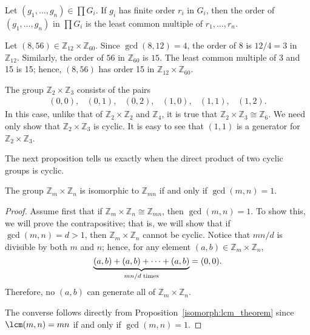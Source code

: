 \begin{corollary}
Let $(g_1, \ldots, g_n) \in \prod G_i$. If $g_i$ has finite order
$r_i$ in $G_i$, then the order of $(g_1, \ldots, g_n)$ in $\prod G_i$
is the least common multiple of $r_1, \ldots, r_n$.
\end{corollary}
 
 
\begin{example}\label{example:isomorph:Z12xZ60}
Let $(8, 56) \in {\mathbb Z}_{12} \times  {\mathbb Z}_{60}$. Since
$\gcd(8,12) = 4$, the order of 8 is $12/4 = 3$ in ${\mathbb Z}_{12}$.
Similarly, the order of $56$ in ${\mathbb Z}_{60}$ is $15$. The least
common multiple of 3 and 15 is 15; hence, $(8, 56)$ has order 15 in
${\mathbb Z}_{12} \times  {\mathbb Z}_{60}$.
\end{example}

 
\begin{example}\label{example:isomorph:Z2xZ3}
The group ${\mathbb Z}_2 \times {\mathbb Z}_3$ consists of the pairs
\[
\begin{array}{cccccc}
(0,0),& (0, 1),& (0, 2),& (1,0),& (1, 1),& (1, 2).
\end{array}
\]
In this case, unlike that of ${\mathbb Z}_2 \times {\mathbb Z}_2$ and
${\mathbb Z}_4$, it 
is true that ${\mathbb Z}_2  \times {\mathbb Z}_3 \cong {\mathbb Z}_6$. We need
only show that ${\mathbb Z}_2  \times {\mathbb Z}_3$ is cyclic.  It is
easy to see that $(1,1)$ is a generator for ${\mathbb Z}_2  \times {\mathbb
Z}_3$. 
\end{example}

 
The next proposition tells us exactly when the direct product of two
cyclic groups is cyclic. 
 

\begin{thm}\label{Z_pq_theorem}
The group ${\mathbb Z}_m \times {\mathbb Z}_n$ is isomorphic to ${\mathbb
Z}_{mn}$ if and only if $\gcd(m,n)=1$. 
\end{thm}
 

\begin{proof}
Assume first that if ${\mathbb Z}_m \times {\mathbb Z}_n \cong {\mathbb
Z}_{mn}$, then $\gcd(m, n) = 1$. To show this, we will prove the
contrapositive; that is, we will show that if $\gcd(m, n) = d >
1$, then ${\mathbb Z}_m \times {\mathbb Z}_n$ cannot be cyclic. Notice that
$mn/d$ is divisible by both $m$ and $n$; hence, for any element $(a,b)
\in {\mathbb Z}_m \times {\mathbb Z}_n$,  
\[
\underbrace{(a,b) + (a,b)+ \cdots + (a,b)}_{mn/d \; {\rm
times}}
= (0, 0).
\]
Therefore, no $(a, b)$ can generate all of ${\mathbb Z}_m \times {\mathbb
Z}_n$. 

 
The converse follows directly from Proposition~\ref{isomorph:lcm_theorem} since
$\lcm(m,n) = mn$ if and only if $\gcd(m,n)=1$. 
\end{proof}
 

